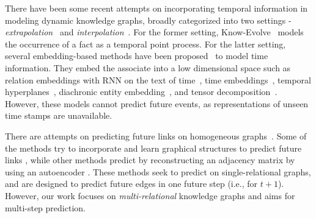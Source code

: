 



There have been some recent attempts on incorporating temporal information in modeling dynamic knowledge graphs, broadly categorized into two settings - \textit{extrapolation}~\citep{Trivedi2017KnowEvolveDT} and \textit{interpolation}~\citep{GarcaDurn2018LearningSE,leblay2018deriving,Dasgupta2018HyTEHT,goel2020diachronic,Lacroix2020Tensor}.
For the former setting, Know-Evolve~\citep{Trivedi2017KnowEvolveDT} models the occurrence of a fact as a temporal point process. 
For the latter setting, several embedding-based methods have been proposed~\citep{GarcaDurn2018LearningSE,leblay2018deriving,Dasgupta2018HyTEHT,goel2020diachronic,Lacroix2020Tensor} to model time information.
They embed the associate into a low dimensional space such as relation embeddings with RNN on the text of time~\citep{GarcaDurn2018LearningSE}, time embeddings~\citep{leblay2018deriving}, temporal hyperplanes~\citep{leblay2018deriving}, diachronic entity embedding~\citep{goel2020diachronic}, and tensor decomposition~\citep{Lacroix2020Tensor}.
However, these models cannot predict future events, as representations of unseen time stamps are unavailable.



There are attempts on predicting future links on homogeneous graphs~\citep{Pareja2019EvolveGCNEG,goyal2018dyngem,goyal2019dyngraph2vec,zhou2018dynamic,singer2019node}.
Some of the methods try to incorporate and learn graphical structures to predict future links \citep{Pareja2019EvolveGCNEG,zhou2018dynamic,singer2019node}, while other methods predict by reconstructing an adjacency matrix by using an autoencoder \citep{goyal2018dyngem,goyal2019dyngraph2vec}.
These methods seek to predict on single-relational graphs, and are designed to predict future edges in one future step (i.e., for $t+1$).
However, our work focuses on \textit{multi-relational} knowledge graphs and aims for multi-step prediction.





